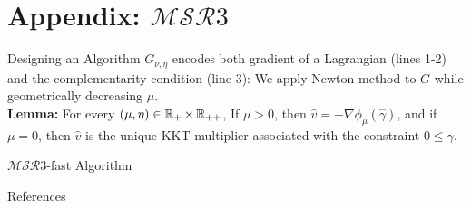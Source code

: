 \documentclass[8pt]{beamer}
\newcommand{\ouralgo}{\ensuremath{\mathcal{MSR}3}}
\begin{document}
\section{Appendix: $\mathcal{MSR}3$}
\begin{frame}{Designing an Algorithm}
	$G_{\nu,\eta}$ encodes both gradient of a Lagrangian (lines 1-2) and the complementarity condition (line 3):
	We apply Newton method to $G$ while geometrically decreasing $\mu$. \\
\textbf{Lemma:} For every $(\mu,\eta) \in \operatorname{\mathbb{R}}_+\times\operatorname{\mathbb{R}}_{++}$,
If $\mu > 0$, then $\hat{v} = -\nabla\phi_\mu(\hat{\gamma})$, and if $\mu = 0$, then $\hat{v}$ is the unique KKT multiplier associated with the constraint $0 \leq \gamma$.
\end{frame}

\begin{frame}{$\ouralgo$-fast Algorithm}

\end{frame}

\begin{frame}{References}
    \printbibliography[heading=none]
\end{frame}
\end{document}
